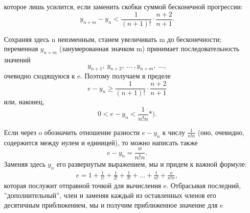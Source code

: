 \documentclass[a5paper, 10pt]{book}
\begin{document}
    \newpage

    \begin{center}
    \end{center}

    которое лишь усилится, если заменить скобки суммой бесконечной прогрессии:
    \[y_{n+m} - y_n < \frac{1}{(n+1)!} \cdot \frac{n+2}{n+1}.\]
    \par Сохраняя здесь n неизменным, станем увеличивать m до бесконечности; переменная $y_{n+m}$ (занумерованная значком m) принимает последовательность значений
    \[y_{n+1},\:y_{n+2},\:...\:,y_{n+m},\:...,\]
    очевидно сходящуюся к e. Поэтому получаем в пределе
    \[e - y_n \geq \frac{1}{(n+1)!} \cdot \frac{n+2}{n+1}\]
    или, наконец,
    \[0 < e - y_n < \frac{1}{n!n}*).\]
    \par Если через o обозначить отношение разности $e - y_n$ к числу $\frac{1}{n!n}$ (оно, очевидно, содержится между нулем и единицей), то можно написать также
    \[e - y_n = \frac{o}{n!n}.\]
    Заменяя здесь $y_n$ его развернутым выражением, мы и придем к важной формуле:
    \begin{eqnarray}
        e = 1 + \frac{1}{1!} + \frac{1}{2!} + \frac{1}{3!} + ... + \frac{1}{n!} + \frac{o}{n!n},
    \end{eqnarray}
    которая послужит отправной точкой для вычисления e. Отбрасывая последний, ''дополнительный'', член и заменяя каждый из оставленных членов его десятичным приближением, мы и получим приближенное значение для e
\end{document}

